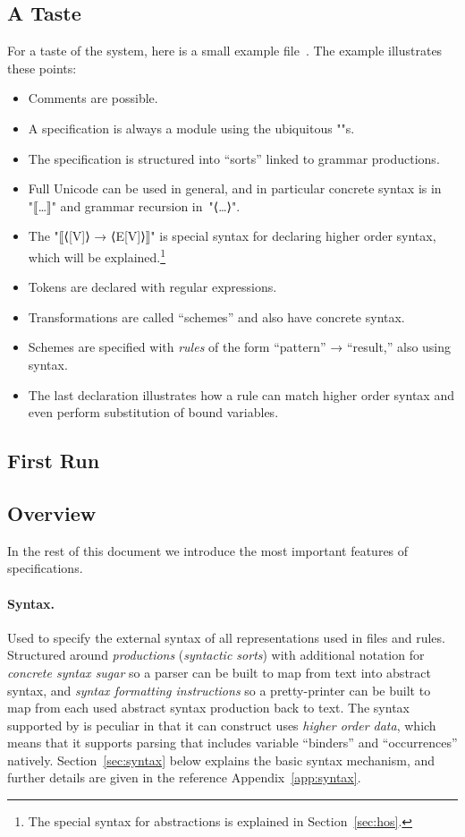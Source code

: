 \documentclass[11pt]{article} %
\begin{document}
\subsection{A Taste}

For a taste of the system, here is a small example file~\cite[samples/guide/fupz.hx]{crsx}.
The example illustrates these points:
\begin{itemize}
\item Comments are possible.
\item A specification is always a module using the ubiquitous "{}"s.
\item The specification is structured into ``sorts'' linked to grammar productions.
\item Full Unicode can be used in general, and in particular concrete syntax is in "⟦…⟧" and grammar
  recursion in~"⟨…⟩".
\item The "⟦⟨[V]⟩ → ⟨E[V]⟩⟧" is special syntax for declaring higher order syntax, which will be
  explained.\footnote{The special syntax for abstractions is explained in Section~\ref{sec:hos}.}
\item Tokens are declared with regular expressions.
\item Transformations are called ``schemes'' and also have concrete syntax.
\item Schemes are specified with \emph{rules} of the form ``pattern'' → ``result,'' also using
  syntax.
\item The last declaration illustrates how a rule can match higher order syntax and even perform
  substitution of bound variables.
\end{itemize}

\subsection{First Run}



\subsection{Overview}

In the rest of this document we introduce the most important features of \HAX specifications.

\paragraph*{Syntax.} Used to specify the external syntax of all representations used in files and
rules. Structured around \emph{productions} (\aka \emph{syntactic sorts}) with additional notation
for \emph{concrete syntax sugar} so a parser can be built to map from text into abstract syntax, and
\emph{syntax formatting instructions} so a pretty-printer can be built to map from each used
abstract syntax production back to text.  The syntax supported by \HAX is peculiar in that it can
construct uses \emph{higher order data}, which means that it supports parsing that includes variable
``binders'' and ``occurrences'' natively.  Section~\ref{sec:syntax} below explains the basic syntax
mechanism, and further details are given in the reference Appendix~\ref{app:syntax}.
\end{document}
